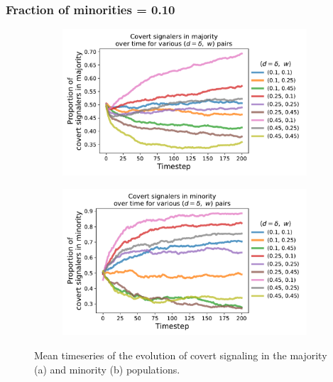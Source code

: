 \documentclass[11pt,letterpaper]{article}
\begin{document}
\subsubsection{Fraction of minorities = 0.10}
\begin{figure}[H]
  \centering
  \begin{subfigure}{0.49\textwidth}
    \centering
    \includegraphics[width=\textwidth]{prelim/Figures/covert_series_majority.pdf}
    \caption{}
    \label{fig:}
  \end{subfigure}
  \begin{subfigure}{0.49\textwidth}
    \centering
    \includegraphics[width=\textwidth]{prelim/Figures/covert_series_minority.pdf}
    \caption{}
    \label{fig:}
  \end{subfigure}
  \caption{Mean timeseries of the evolution of covert signaling in the
    majority (a) and minority (b) populations.}
  \label{fig:}
\end{figure}
\end{document}
